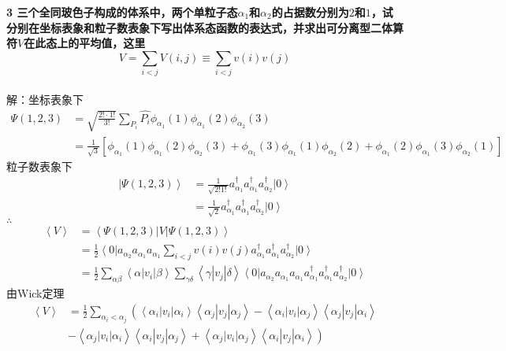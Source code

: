 \documentclass[12pt]{article}
\numberwithin{equation}{section}	 %
\begin{document}
\begin{spacing}{1.5}
\textbf{3 \quad 三个全同玻色子构成的体系中，两个单粒子态$\alpha_{1}$和$\alpha_{2}$的占据数分别为$2$和$1$，试分别在坐标表象和粒子数表象下写出体系态函数的表达式，并求出可分离型二体算符$V$在此态上的平均值，这里
\begin{equation}\nonumber 		%
V = \sum_{i<j}V(i,j) \equiv \sum_{i<j}v(i)v(j)
\end{equation}
}
~\\
解：坐标表象下
\begin{align*}
\Psi(1,2,3) &= \sqrt{\frac{2!\cdot1!}{3!}}\sum_{P_{i}}\hat{P_{i}}\phi_{\alpha_{1}}(1)\phi_{\alpha_{1}}(2)\phi_{\alpha_{2}}(3) \\
&= \frac{1}{\sqrt{3}}\left[ \phi_{\alpha_{1}}(1)\phi_{\alpha_{1}}(2)\phi_{\alpha_{2}}(3) + \phi_{\alpha_{1}}(3)\phi_{\alpha_{1}}(1)\phi_{\alpha_{2}}(2) + \phi_{\alpha_{1}}(2)\phi_{\alpha_{1}}(3)\phi_{\alpha_{2}}(1) \right]
\end{align*}
粒子数表象下
\begin{align*}
\left| \Psi(1,2,3) \right> &= \frac{1}{\sqrt{2!1!}}a^{\dag}_{\alpha_{1}}a^{\dag}_{\alpha_{1}}a^{\dag}_{\alpha_{2}} \left|0\right> \\
&= \frac{1}{\sqrt{2}}a^{\dag}_{\alpha_{1}}a^{\dag}_{\alpha_{1}}a^{\dag}_{\alpha_{2}} \left|0\right>
\end{align*}
$\therefore$ 
\begin{align*}
\left<V\right> &= \left< \Psi(1,2,3) \right| V \left| \Psi(1,2,3) \right> \\
&= \frac{1}{2} \left<0\right| a_{\alpha_{2}}a_{\alpha_{1}}a_{\alpha_{1}} \sum_{i<j}v(i)v(j) a^{\dag}_{\alpha_{1}}a^{\dag}_{\alpha_{1}}a^{\dag}_{\alpha_{2}} \left|0\right> \\
&= \frac{1}{2} \sum_{\alpha\beta} \left<\alpha\left|v_{i}\right|\beta\right> \sum_{\gamma\delta} \left<\gamma\left|v_{j}\right|\delta\right> \left<0\right| a_{\alpha_{2}}a_{\alpha_{1}}a_{\alpha_{1}} a^{\dag}_{\alpha_{1}}a^{\dag}_{\alpha_{1}}a^{\dag}_{\alpha_{2}} \left|0\right>
\end{align*}
由Wick定理
\begin{equation}
\begin{aligned}
\left<V\right> &= \frac{1}{2} \sum_{\alpha_{i}<\alpha_{j}} \left( {\left<\alpha_{i}\left|v_{i}\right|\alpha_{i}\right>\left<\alpha_{j}\left|v_{j}\right|\alpha_{j}\right> - \left<\alpha_{i}\left|v_{i}\right|\alpha_{j}\right>\left<\alpha_{j}\left|v_{j}\right|\alpha_{i}\right>} \right. \\
 & \left. {- \left<\alpha_{j}\left|v_{i}\right|\alpha_{i}\right>\left<\alpha_{i}\left|v_{j}\right|\alpha_{j}\right> + \left<\alpha_{j}\left|v_{i}\right|\alpha_{j}\right>\left<\alpha_{i}\left|v_{j}\right|\alpha_{i}\right>} \right)

\end{aligned}
\end{equation}
\end{spacing}
\end{document}
